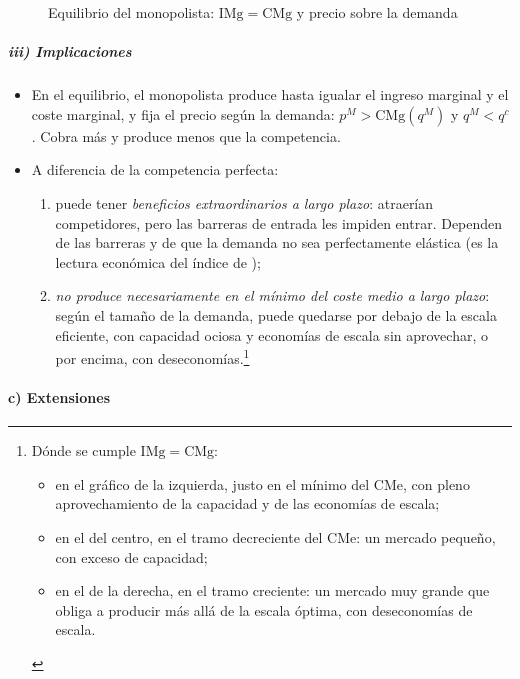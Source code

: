 \documentclass[11pt]{article}
\begin{document}
\begin{figure}[H]
\centering
\caption{Equilibrio del monopolista: $\mathrm{IMg}=\mathrm{CMg}$ y precio sobre la demanda}\label{fig:equilibrio-monopolio}
\end{figure}

\subparagraph{iii) Implicaciones}

\begin{itemize}
\item En el equilibrio, el monopolista produce hasta igualar el ingreso marginal y el coste marginal, y fija el precio según la demanda: $p^M>\mathrm{CMg}(q^M)$ y $q^M<q^c$. Cobra más y produce menos que la competencia.
\item A diferencia de la competencia perfecta:
  \begin{enumerate}[label=\alph*)]
  \item puede tener \emph{beneficios extraordinarios a largo plazo}: atraerían competidores, pero las barreras de entrada les impiden entrar. Dependen de las barreras y de que la demanda no sea perfectamente elástica (es la lectura económica del índice de );
  \item \emph{no produce necesariamente en el mínimo del coste medio a largo plazo}: según el tamaño de la demanda, puede quedarse por debajo de la escala eficiente, con capacidad ociosa y economías de escala sin aprovechar, o por encima, con deseconomías.\footnote{Dónde se cumple $\mathrm{IMg}=\mathrm{CMg}$:
\begin{itemize}
\item en el gráfico de la izquierda, justo en el mínimo del CMe, con pleno aprovechamiento de la capacidad y de las economías de escala;
\item en el del centro, en el tramo decreciente del CMe: un mercado pequeño, con exceso de capacidad;
\item en el de la derecha, en el tramo creciente: un mercado muy grande que obliga a producir más allá de la escala óptima, con deseconomías de escala.
\end{itemize}
}
  \end{enumerate}
\end{itemize}

\paragraph{c) Extensiones}
\end{document}
